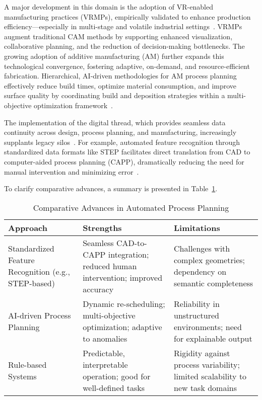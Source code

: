 \documentclass[11pt]{article}
\begin{document}
A major development in this domain is the adoption of VR-enabled manufacturing practices (VRMPs), empirically validated to enhance production efficiency—especially in multi-stage and volatile industrial settings~\cite{ref83}. VRMPs augment traditional CAM methods by supporting enhanced visualization, collaborative planning, and the reduction of decision-making bottlenecks. The growing adoption of additive manufacturing (AM) further expands this technological convergence, fostering adaptive, on-demand, and resource-efficient fabrication. Hierarchical, AI-driven methodologies for AM process planning effectively reduce build times, optimize material consumption, and improve surface quality by coordinating build and deposition strategies within a multi-objective optimization framework~\cite{ref2,ref5,ref6,ref7,ref15,ref20,ref27,ref44,ref47,ref48,ref52,ref58,ref59,ref69,ref84}.

The implementation of the digital thread, which provides seamless data continuity across design, process planning, and manufacturing, increasingly supplants legacy silos~\cite{ref11,ref51}. For example, automated feature recognition through standardized data formats like STEP facilitates direct translation from CAD to computer-aided process planning (CAPP), dramatically reducing the need for manual intervention and minimizing error~\cite{ref51}. 

To clarify comparative advances, a summary is presented in Table~\ref{tab:capp_advancements}.

\begin{table}[ht]
\centering
\caption{Comparative Advances in Automated Process Planning}
\label{tab:capp_advancements}
\begin{tabular}{|p{4cm}|p{5.5cm}|p{5cm}|}
\hline
\textbf{Approach} & \textbf{Strengths} & \textbf{Limitations} \\
\hline
Standardized Feature Recognition (e.g., STEP-based) & Seamless CAD-to-CAPP integration; reduced human intervention; improved accuracy & Challenges with complex geometries; dependency on semantic completeness \\
\hline
AI-driven Process Planning & Dynamic re-scheduling; multi-objective optimization; adaptive to anomalies & Reliability in unstructured environments; need for explainable output \\
\hline
Rule-based Systems & Predictable, interpretable operation; good for well-defined tasks & Rigidity against process variability; limited scalability to new task domains \\
\hline
\end{tabular}
\end{table}
\end{document}

